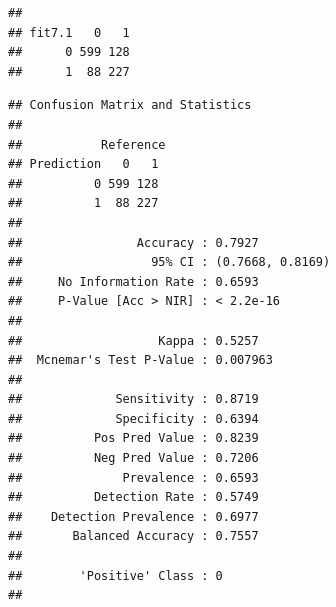 \documentclass[]{article}
\newenvironment{Shaded}{\begin{snugshade}}{\end{snugshade}}
\newcommand{\KeywordTok}[1]{\textcolor[rgb]{0.13,0.29,0.53}{\textbf{#1}}}
\newcommand{\DataTypeTok}[1]{\textcolor[rgb]{0.13,0.29,0.53}{#1}}
\newcommand{\DecValTok}[1]{\textcolor[rgb]{0.00,0.00,0.81}{#1}}
\newcommand{\StringTok}[1]{\textcolor[rgb]{0.31,0.60,0.02}{#1}}
\newcommand{\CommentTok}[1]{\textcolor[rgb]{0.56,0.35,0.01}{\textit{#1}}}
\newcommand{\OperatorTok}[1]{\textcolor[rgb]{0.81,0.36,0.00}{\textbf{#1}}}
\newcommand{\NormalTok}[1]{#1}
\begin{document}
\begin{Shaded}
\end{Shaded}

\begin{verbatim}
##       
## fit7.1   0   1
##      0 599 128
##      1  88 227
\end{verbatim}

\begin{Shaded}
\end{Shaded}

\begin{verbatim}
## Confusion Matrix and Statistics
## 
##           Reference
## Prediction   0   1
##          0 599 128
##          1  88 227
##                                           
##                Accuracy : 0.7927          
##                  95% CI : (0.7668, 0.8169)
##     No Information Rate : 0.6593          
##     P-Value [Acc > NIR] : < 2.2e-16       
##                                           
##                   Kappa : 0.5257          
##  Mcnemar's Test P-Value : 0.007963        
##                                           
##             Sensitivity : 0.8719          
##             Specificity : 0.6394          
##          Pos Pred Value : 0.8239          
##          Neg Pred Value : 0.7206          
##              Prevalence : 0.6593          
##          Detection Rate : 0.5749          
##    Detection Prevalence : 0.6977          
##       Balanced Accuracy : 0.7557          
##                                           
##        'Positive' Class : 0               
## 
\end{verbatim}

\begin{Shaded}
\end{Shaded}
\end{document}
